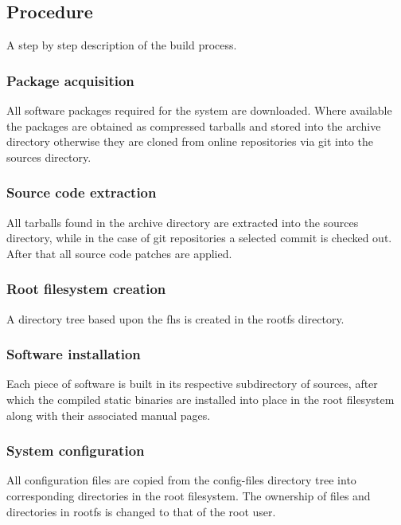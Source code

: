 \subsection{Procedure}

A step by step description of the build process.

\subsubsection{Package acquisition}

All software packages required for the system are downloaded. Where available the packages are obtained as compressed tarballs and stored into the archive directory otherwise they are cloned from online repositories via git into the sources directory.

\subsubsection{Source code extraction}

All tarballs found in the archive directory are extracted into the sources directory, while in the case of git repositories a selected commit is checked out. After that all source code patches are applied.

\subsubsection{Root filesystem creation}

A directory tree based upon the \gls{fhs} \cite{fhs} is created in the rootfs directory.

\subsubsection{Software installation}

Each piece of software is built in its respective subdirectory of sources, after which the compiled static binaries are installed into place in the root filesystem along with their associated manual pages.

\subsubsection{System configuration}

All configuration files are copied from the config-files directory tree into corresponding directories in the root filesystem. The ownership of files and directories in rootfs is changed to that of the root user.

